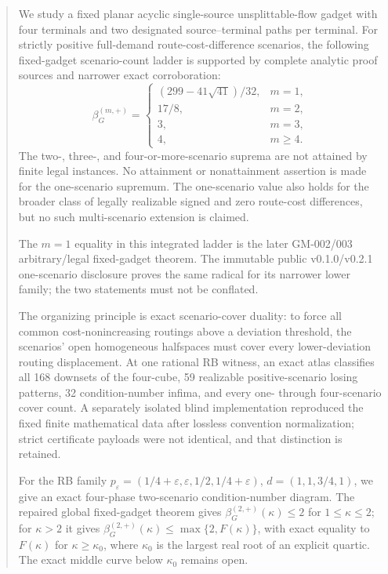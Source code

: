 \documentclass[11pt]{article}
\theoremstyle{remark}
\newcommand{\eps}{\varepsilon}
\begin{document}
\begin{abstract}
We study a fixed planar acyclic single-source unsplittable-flow gadget with four
terminals and two designated source--terminal paths per terminal. For strictly
positive full-demand route-cost-difference scenarios, the following
fixed-gadget scenario-count ladder is supported by complete analytic proof
sources and narrower exact corroboration:
\[
\beta_G^{(m,+)}=
\begin{cases}
(299-41\sqrt{41})/32,&m=1,\\
17/8,&m=2,\\
3,&m=3,\\
4,&m\ge4.
\end{cases}
\]
The two-, three-, and four-or-more-scenario suprema are not attained by finite
legal instances. No attainment or nonattainment assertion is made for the
one-scenario supremum. The one-scenario value also holds for the broader class of
legally realizable signed and zero route-cost differences, but no such
multi-scenario extension is claimed.

The $m=1$ equality in this integrated ladder is the later GM-002/003
arbitrary/legal fixed-gadget theorem. The immutable public v0.1.0/v0.2.1
one-scenario disclosure proves the same radical for its narrower lower family;
the two statements must not be conflated.

The organizing principle is exact scenario-cover duality: to force all common
cost-nonincreasing routings above a deviation threshold, the scenarios' open
homogeneous halfspaces must cover every lower-deviation routing displacement.
At one rational RB witness, an exact atlas classifies all 168 downsets of the
four-cube, 59 realizable positive-scenario losing patterns, 32
condition-number infima, and every one- through four-scenario cover count.
A separately isolated blind implementation reproduced the fixed finite
mathematical data after lossless convention normalization; strict certificate
payloads were not identical, and that distinction is retained.

For the RB family
$p_\eps=(1/4+\eps,\eps,1/2,1/4+\eps)$,
$d=(1,1,3/4,1)$, we give an exact four-phase two-scenario condition-number
diagram. The repaired global fixed-gadget theorem gives
$\beta_G^{(2,+)}(\kappa)\le2$ for $1\le\kappa\le2$; for $\kappa>2$ it gives
$\beta_G^{(2,+)}(\kappa)\le\max\{2,F(\kappa)\}$, with exact equality to
$F(\kappa)$ for $\kappa\ge\kappa_0$, where $\kappa_0$ is the largest real
root of an explicit quartic. The exact middle curve below $\kappa_0$ remains
open.
\end{abstract}
\end{document}
